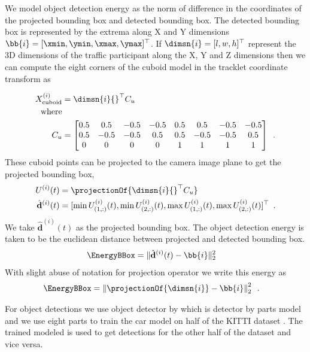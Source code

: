 We model object detection energy as the norm of difference in the coordinates
of the projected bounding box and detected bounding box. The detected bounding
box is represented by the extrema along X and Y dimensions $\bb{i} = [\xmin,
\ymin, \xmax, \ymax]^\top$. If $\dimsn{i} = [l, w, h]^\top$ represent the 3D
dimensions of the traffic participant along the X, Y and Z dimensions then we 
can compute the eight corners of the cuboid model in the tracklet coordinate transform as

\begin{align}
  X^{(i)}_{\text{cuboid}} &= \dimsn{i}{}^\top C_u \\
  \text{where} &\\
  C_u &= 
  \begin{bmatrix}
  0.5 & 0.5 & -0.5 & -0.5 & 0.5 & 0.5 & -0.5 & -0.5 \\
    0.5 & -0.5 & -0.5 & 0.5 & 0.5 & -0.5 & -0.5 & 0.5 \\
    0 & 0 & 0 & 0 & 1  & 1 & 1 & 1
  \end{bmatrix} \enspace .
\end{align}
These cuboid points can be projected to the camera image plane to get the projected bounding box,
\newcommand{\ucub}{U^{(i)}(t)}
\newcommand{\ucubx}{U_{(1,:)}^{(i)}(t)}
\newcommand{\ucuby}{U_{(2,:)}^{(i)}(t)}
\newcommand{\estbb}{\hat{\mathbf{d}}^{(i)}(t)}
\begin{align}
  \ucub &= \projectionOf{\dimsn{i}{}^\top C_u}\\
  \estbb &= [\min \ucubx, \min \ucuby, \max \ucubx, \max \ucuby]^\top \enspace .
\end{align}
We take $\estbb$ as the projected bounding box. The object detection energy is
taken to be the euclidean distance between projected and detected bounding box.
\begin{align}
  \EnergyBBox &= \| \estbb - \bb{i}\|^2_2
\end{align}
With slight abuse of notation for projection operator we write this energy as
\begin{align}
  \EnergyBBox &= \left\| \projectionOf{\dimsn{i}} - \bb{i}\right\|^2_2 \enspace.
\end{align}

For object detections we use object detector by \cite{Felzenszwalb_etal_2010}
which is detector by parts model and we use eight parts to train the car model 
on half of the KITTI dataset \cite{geiger2013vision}. The trained modeled is 
used to get detections for the other half of the dataset and vice versa.

